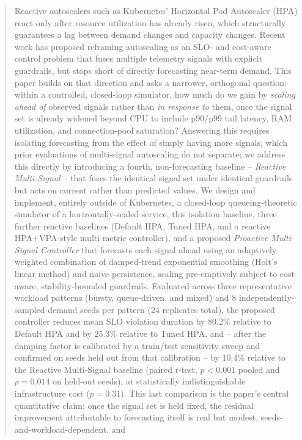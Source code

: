 \documentclass[conference]{IEEEtran}
\begin{document}
\begin{abstract}
Reactive autoscalers such as Kubernetes' Horizontal Pod Autoscaler (HPA) react only after resource
utilization has already risen, which structurally guarantees a lag between demand changes and
capacity changes. Recent work has proposed reframing autoscaling as an SLO- and cost-aware control
problem that fuses multiple telemetry signals with explicit guardrails, but stops short of directly
forecasting near-term demand. This paper builds on that direction and asks a narrower, orthogonal
question: within a controlled, closed-loop simulator, how much do we gain by \emph{scaling ahead of}
observed signals rather than \emph{in response to} them, once the signal set is already widened beyond
CPU to include p90/p99 tail latency, RAM utilization, and connection-pool saturation? Answering this
requires isolating forecasting from the effect of simply having more signals, which prior evaluations
of multi-signal autoscaling do not separate; we address this directly by introducing a fourth,
non-forecasting baseline -- \emph{Reactive Multi-Signal} -- that fuses the identical signal set under
identical guardrails but acts on current rather than predicted values. We design and implement,
entirely outside of Kubernetes, a closed-loop queueing-theoretic simulator of a horizontally-scaled
service, this isolation baseline, three further reactive baselines (Default HPA, Tuned HPA, and a
reactive HPA+VPA-style multi-metric controller), and a
proposed \emph{Proactive Multi-Signal Controller} that forecasts each signal ahead using an adaptively
weighted combination of damped-trend exponential smoothing (Holt's linear method) and naive persistence,
scaling pre-emptively subject to cost-aware, stability-bounded guardrails. Evaluated across three
representative workload patterns (bursty, queue-driven, and mixed) and 8 independently-sampled demand
seeds per pattern (24 replicates total), the proposed controller reduces mean SLO violation duration by
80.2\% relative to Default HPA and by 25.3\% relative to Tuned HPA, and -- after the damping factor is
calibrated by a train/test sensitivity sweep and confirmed on seeds held out from that calibration --
by 10.4\% relative to the Reactive Multi-Signal baseline (paired $t$-test, $p<0.001$ pooled and $p=0.014$
on held-out seeds), at statistically indistinguishable infrastructure cost ($p=0.31$). This last
comparison is the paper's central quantitative claim: once the signal set is held fixed, the residual
improvement attributable to forecasting itself is real but modest, seeds-and-workload-dependent, and

\end{abstract}
\end{document}

